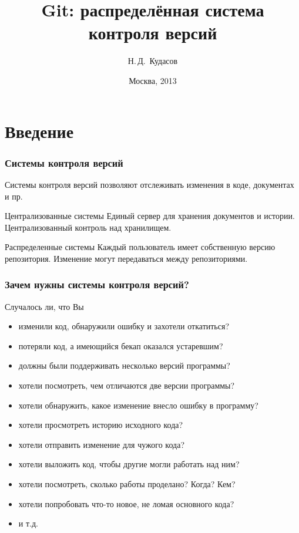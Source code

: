 \documentclass{beamer}
\begin{document}
\title[]{Git: распределённая система контроля версий}
\author{Н.\,Д.~Кудасов}
\date{Москва, 2013}

\begin{frame}
\addtocounter{framenumber}{-1}
\maketitle
\end{frame}

\section{Введение}

\begin{frame}
  \frametitle{Системы контроля версий}

  Системы контроля версий позволяют отслеживать изменения в коде, документах и пр.

  \begin{block}{Централизованные системы}
  Единый сервер для хранения документов и истории.
  Централизованный контроль над хранилищем.
  \end{block}

  \begin{block}{Распределенные системы}
  Каждый пользователь имеет собственную версию репозитория.
  Изменение могут передаваться между репозиториями.
  \end{block}
\end{frame}

\begin{frame}
  \frametitle{Зачем нужны системы контроля версий?}
  Случалось ли, что Вы
  \begin{itemize}
    \item изменили код, обнаружили ошибку и захотели откатиться?
    \item потеряли код, а имеющийся бекап оказался устаревшим?
    \item должны были поддерживать несколько версий программы?
    \item хотели посмотреть, чем отличаются две версии программы?
    \item хотели обнаружить, какое изменение внесло ошибку в программу?
    \item хотели просмотреть историю исходного кода?
    \item хотели отправить изменение для чужого кода?
    \item хотели выложить код, чтобы другие могли работать над ним?
    \item хотели посмотреть, сколько работы проделано? Когда? Кем?
    \item хотели попробовать что-то новое, не ломая основного кода?
    \item и т.д.
  \end{itemize}
\end{frame}
\end{document}
